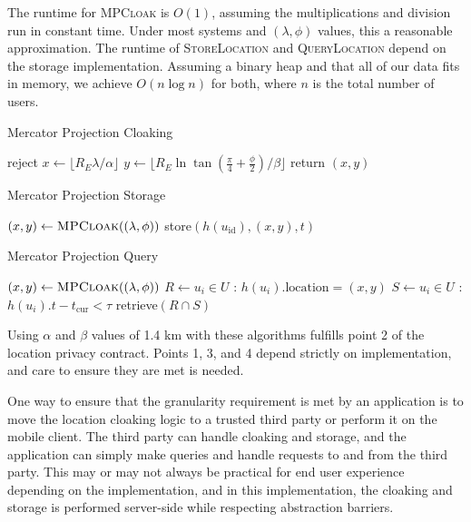 The runtime for \textsc{MPCloak} is $O(1)$, assuming the multiplications and division run in constant time. Under most systems and $(\lambda, \phi)$ values, this a reasonable approximation. The runtime of \textsc{StoreLocation} and \textsc{QueryLocation} depend on the storage implementation. Assuming a binary heap and that all of our data fits in memory, we achieve $O(n\log n)$ for both, where $n$ is the total number of users.

\begin{algorithm}[h!] \label{mercatoralgo}
\caption{Mercator Projection Cloaking} \label{mer-cloak}
\begin{algorithmic}[1]
\State reject
\EndIf
\State $x \gets \lfloor R_E\lambda / \alpha \rfloor$
\State $y \gets \lfloor R_E \ln \tan\left( \frac{\pi}{4} + \frac{\phi}{2}\right) / \beta \rfloor $
\State return $(x, y)$
\EndProcedure
\end{algorithmic}
\end{algorithm}

\begin{algorithm}[h!] \label{mercatoralgostore}
\caption{Mercator Projection Storage} \label{mer-store}
\begin{algorithmic}[1]
\State $(x,y) \gets \text{\scshape MPCloak}((\lambda, \phi))$
\State store$(h(u_\text{id}), (x, y), t)$
\EndProcedure
\end{algorithmic}
\end{algorithm}

\begin{algorithm}[h!] \label{mercatoralgoquery}
\caption{Mercator Projection Query} \label{mer-query}
\begin{algorithmic}[1]
\State $(x,y) \gets \text{\scshape MPCloak}((\lambda, \phi))$
\State $R \gets u_i \in U$ : $h(u_i).\text{location} = (x,y)$
\State $S \gets u_i \in U$ : $h(u_i).t - t_{\text{cur}} < \tau$
\State retrieve$(R \cap S)$
\EndProcedure
\end{algorithmic}
\end{algorithm}

Using $\alpha$ and $\beta$ values of 1.4 km with these algorithms fulfills point 2 of the location privacy contract. Points 1, 3, and 4 depend strictly on implementation, and care to ensure they are met is needed.

One way to ensure that the granularity requirement is met by an application is to move the location cloaking logic to a trusted third party or perform it on the mobile client. The third party can handle cloaking and storage, and the application can simply make queries and handle requests to and from the third party. This may or may not always be practical for end user experience depending on the implementation, and in this implementation, the cloaking and storage is performed server-side while respecting abstraction barriers.

